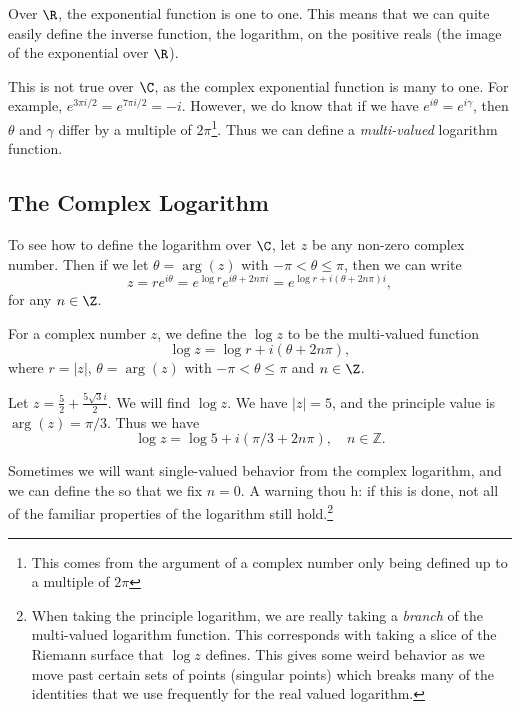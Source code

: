 \documentclass[a4paper]{scrreprt}
\begin{document}
Over $\R$, the exponential function is one to one. This means that we can quite easily define the inverse function, the logarithm, on the positive reals (the image of the exponential over $\R$).

This is not true over $\C$, as the complex exponential function is many to one. For example, $e^{3\pi i/2} = e^{7 \pi i/2} = -i$. However, we do know that if we have $e^{i\theta} = e^{i \gamma}$, then $\theta$ and $\gamma$ differ by a multiple of $2 \pi$\footnote{This comes from the argument of a complex number only being defined up to a multiple of $2\pi$}. Thus we can define a \emph{multi-valued} logarithm function.

\subsection{The Complex Logarithm}

To see how to define the logarithm over $\C$, let $z$ be any non-zero complex number. Then if we let $\theta = \arg(z)$ with $-\pi < \theta \leq \pi$, then we can write
$$
z = re^{i \theta} =  e^{\log r} e^{i \theta + 2n \pi i} = e^{\log r + i(\theta + 2n \pi)i},
$$
for any $n \in \Z$.

\begin{definition}
	For a complex number $z$, we define the  $\log z$ to be the multi-valued function
	$$
	\log z = \log r + i(\theta + 2n\pi),
	$$
	where $r = |z|$, $\theta = \arg (z)$ with $- \pi < \theta \leq \pi$ and $n \in \Z$.
\end{definition}

\begin{example}
	Let $z = \frac{5}{2} + \frac{5\sqrt{3} i}{2}$. We will find $\log z$. We have $|z| = 5$, and the principle value is $\arg(z) = \pi/3$. Thus we have
	$$
	\log z = \log 5 + i (\pi/3 + 2n \pi), \quad n \in \mathbb{Z}.
	$$
\end{example}

Sometimes we will want single-valued behavior from the complex logarithm, and we can define the  so that we fix $n = 0$. A warning thou h: if this is done, not all of the familiar properties of the logarithm still hold.\footnote{When taking the principle logarithm, we are really taking a \emph{branch} of the multi-valued logarithm function. This corresponds with taking a slice of the Riemann surface that $\log z$ defines. This gives some weird behavior as we move past certain sets of points (singular points) which breaks many of the identities that we use frequently for the real valued logarithm.}
\end{document}
